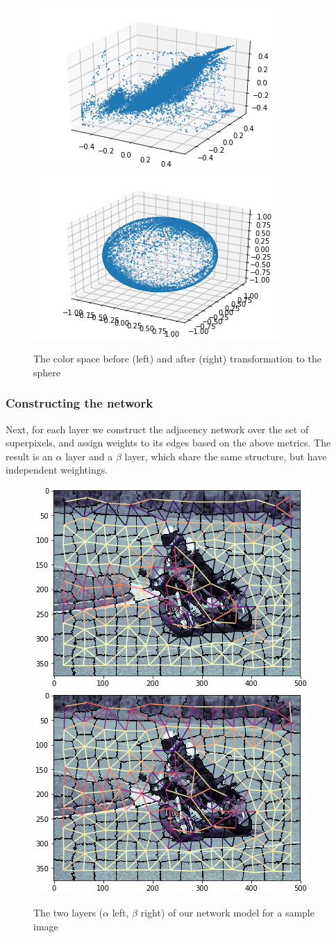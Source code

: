 \documentclass[twocolumn]{article}
\newcommand{\figlab}[1]{\label{fig:#1}}
\begin{document}
\begin{figure}[h]
  \centering
  \includegraphics[width=0.45\linewidth]{figs/cloud.png}
  \includegraphics[width=0.45\linewidth]{figs/sphere.png}
  \caption{
    The color space before (left) and after (right) transformation to the sphere
  }
\end{figure}

\subsubsection{Constructing the network}

Next, for each layer we construct the adjacency network over the set of superpixels, and assign weights to its edges based on the above metrics. The result is an $\alpha$ layer and a $\beta$ layer, which share the same structure, but have independent weightings.

\begin{figure}[h]
  \centering
  \includegraphics[width=0.49\linewidth]{figs/alpha_graph.png}
  \includegraphics[width=0.49\linewidth]{figs/beta_graph.png}
  \caption{
    The two layers ($\alpha$ left, $\beta$ right) of our network model for a sample image
  }
  \figlab{ab_graph}
\end{figure}
\end{document}
